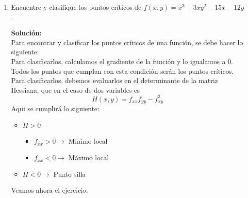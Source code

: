 \documentclass[12pt]{article}
\newenvironment{solucion}
{\begin{mdframed}[backgroundcolor=black!10]
		{\bf Solución:}\\
	}
	{
	\end{mdframed}
}
\newenvironment{preguntas}
{\begin{enumerate}\itemsep12pt
	}
	{
	\end{enumerate}
}
\newcommand{\ra}{\rightarrow}
\begin{document}
\begin{preguntas}
\begin{solucion}
Si nos pidieran la razón de decrecimiento máximo, habría que cambiarle el signo al resultado.
\end{solucion}
\item Encuentre y clasifíque los puntos críticos de $f(x,y)=x^3+3xy^2-15x-12y$.
\begin{solucion}
Para encontrar y clasificar los puntos críticos de una función, se debe hacer lo siguiente:\\

Para clasificarlos, calculamos el gradiente de la función y lo igualamos a 0. Todos los puntos que cumplan con esta condición serán los puntos críticos.\\

Para clasificarlos, debemos evaluarlos en el determinante de la matriz Hessiana, que en el caso de dos variables es
$$H(x,y) = f_{xx}f_{yy} - f_{xy}^2$$
Aqui se cumplirá lo siguiente:
\begin{itemize}
\item $H > 0$
\begin{itemize}
    \item $f_{xx} > 0 \ra$ Mínimo local
    \item $f_{xx} < 0 \ra$ Máximo local
\end{itemize}
\item $H < 0 \ra$ Punto silla
\end{itemize}
Veamos ahora el ejercicio.\\


\end{solucion}
\end{preguntas}
\end{document}
